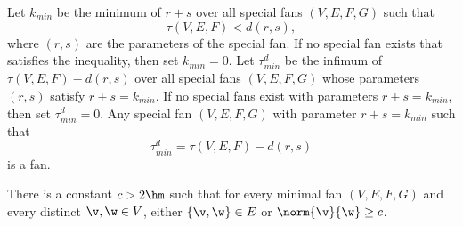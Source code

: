 \begin{definition}
Let $k_{min}$ be the minimum of $r+s$ over
all special fans $(V,E,F,G)$ such that 
\begin{equation}\label{eqn:kmin}
\tau(V,E,F) < d (r,s),
\end{equation}
where $(r,s)$ are the parameters of the special fan.  If no special
fan exists that satisfies the inequality, then set $k_{min}=0$.  Let
$\tau^d_{min}$ be the infimum of $\tau(V,E,F)-d(r,s)$ over all special
fans $(V,E,F,G)$ whose parameters $(r,s)$ satisfy $r+s=k_{min}$.  If
no special fans exist with parameters $r+s=k_{min}$, then set
$\tau^d_{min}=0$.  Any special fan $(V,E,F,G)$ with parameter
$r+s=k_{min}$ such that
\begin{displaymath}
\tau^d_{min}= \tau(V,E,F)-d(r,s)
\end{displaymath}
is a   fan.
\end{definition}


\begin{lemma}\label{lemma:c-bound}
There is a constant $c>2\hm$ such that for every minimal fan
$(V,E,F,G)$ and every distinct $\v,\w\in V$, either $\{\v,\w\}\in E$
or $\norm{\v}{\w}\ge c$.
\end{lemma}


